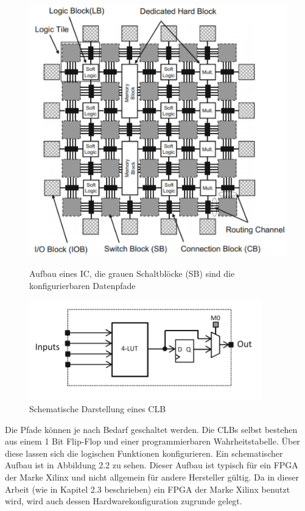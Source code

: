 \begin{figure}[ht]
	\begin{minipage}[b]{.4\linewidth}
  		\includegraphics[scale=0.7]{bilder/matrix}
  		\caption{Aufbau eines IC, die grauen Schaltblöcke (SB) sind die konfigurierbaren Datenpfade}
  	\end{minipage}
  	\hspace{.1\linewidth}%
  	\begin{minipage}[b]{.4\linewidth}
  		\includegraphics[scale=0.70]{bilder/clp}
		\caption{Schematische Darstellung eines CLB\\
		}
	\end{minipage}
	
\end{figure}
Die Pfade können je nach Bedarf geschaltet werden. Die CLBs selbst bestehen aus einem 1 Bit Flip-Flop und einer programmierbaren Wahrheitstabelle. Über diese lassen sich die logischen Funktionen konfigurieren\cite{TOSU}. Ein schematischer Aufbau ist in Abbildung 2.2 zu sehen. Dieser Aufbau ist typisch für ein FPGA der Marke Xilinx und nicht allgemein für andere Hersteller gültig. Da in dieser Arbeit (wie in Kapitel 2.3 beschrieben) ein FPGA der Marke Xilinx benutzt wird, wird auch dessen Hardwarekonfiguration zugrunde gelegt.\\\\
